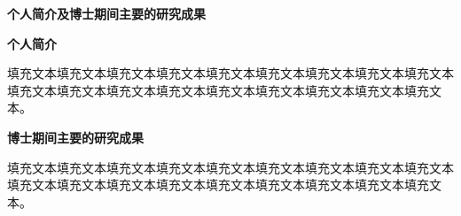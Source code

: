 \newpage
{}
{}
\thispagestyle{plain}
\centerline{\Large \bf 个人简介及博士期间主要的研究成果}

\vspace{1cm}
{\noindent \large \bf 个人简介}

\vspace{0.5cm}
填充文本填充文本填充文本填充文本填充文本填充文本填充文本填充文本填充文本填充文本填充文本填充文本填充文本填充文本填充文本填充文本填充文本填充文本。

\vspace{1cm}
{\noindent \large \bf 博士期间主要的研究成果}

\vspace{0.5cm}
填充文本填充文本填充文本填充文本填充文本填充文本填充文本填充文本填充文本填充文本填充文本填充文本填充文本填充文本填充文本填充文本填充文本填充文本。

